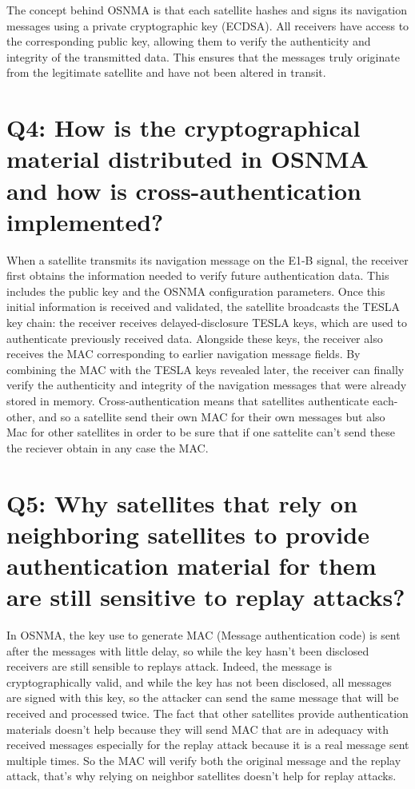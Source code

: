 \documentclass{article}
\begin{document}
The concept behind OSNMA is that each satellite hashes and signs its navigation messages using a private cryptographic key (ECDSA). All receivers have access to the corresponding public key, allowing them to verify the authenticity and integrity of the transmitted data. This ensures that the messages truly originate from the legitimate satellite and have not been altered in transit.

\section*{
Q4: How is the cryptographical material distributed in OSNMA and how is cross-authentication implemented?
}

When a satellite transmits its navigation message on the E1-B signal, the receiver first obtains the information needed to verify future authentication data. This includes the public key and the OSNMA configuration parameters. Once this initial information is received and validated, the satellite broadcasts the TESLA key chain: the receiver receives delayed-disclosure TESLA keys, which are used to authenticate previously received data. Alongside these keys, the receiver also receives the MAC corresponding to earlier navigation message fields. By combining the MAC with the TESLA keys revealed later, the receiver can finally verify the authenticity and integrity of the navigation messages that were already stored in memory. 
Cross-authentication means that satellites authenticate each-other, and so a satellite send their own MAC for their own messages but also Mac for other satellites in order to be sure that if one sattelite can't send these the reciever obtain in any case the MAC.


\section*{
Q5: Why satellites that rely on neighboring satellites to provide authentication material for them are still sensitive to replay attacks?
}

In OSNMA, the key use to generate MAC (Message authentication code) is sent after the messages with little delay, so while the key hasn't been disclosed receivers are still sensible to replays attack. Indeed, the message is cryptographically valid, and while the key has not been disclosed, all messages are signed with this key, so the attacker can send the same message that will be received and processed twice.
The fact that other satellites provide authentication materials doesn't help because they will send MAC that are in adequacy with received messages especially for the replay attack because it is a real message sent multiple times. So the MAC will verify both the original message and the replay attack, that's why relying on neighbor satellites doesn't help for replay attacks.
\end{document}
